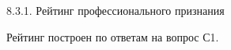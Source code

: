 \begin{frame}{8.3.1. Рейтинг профессионального признания }

\tiny
Рейтинг построен по ответам на вопрос С1.

\fontsize{5pt}{5}\selectfont
\begin{center}
\begin{tabular}{cllc}

\end{tabular}
\end{center}
\end{frame}


